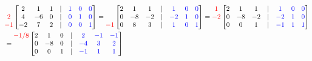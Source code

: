 \documentclass[reqno]{amsart}
\theoremstyle{definition}
\begin{document}
\begin{align*}
&\begin{matrix}
\\
{\color{red}2}\\
{\color{red}-1}
\end{matrix}\begin{bmatrix}
2 & 1 & 1 & | & {\color{blue}1} & {\color{blue}0} & {\color{blue}0}\\
4 & -6 & 0 & | & {\color{blue}0} & {\color{blue}1} & {\color{blue}0}\\
-2 & 7 & 2 & | & {\color{blue}0} & {\color{blue}0} & {\color{blue}1}
\end{bmatrix} = \begin{matrix}
\\
\\
{\color{red}-1}
\end{matrix}\begin{bmatrix}
2 & 1 & 1 & | & {\color{blue}1} & {\color{blue}0} & {\color{blue}0}\\
0 & -8 & -2 & | & {\color{blue}-2} & {\color{blue}1} & {\color{blue}0}\\
0 & 8 & 3 & | & {\color{blue}1} & {\color{blue}0} & {\color{blue}1}
\end{bmatrix} = \begin{matrix}
{\color{red}1}\\
{\color{red}-2}\\
\\
\end{matrix}\begin{bmatrix}
2 & 1 & 1 & | & {\color{blue}1} & {\color{blue}0} & {\color{blue}0}\\
0 & -8 & -2 & | & {\color{blue}-2} & {\color{blue}1} & {\color{blue}0}\\
0 & 0 & 1 & | & {\color{blue}-1} & {\color{blue}1} & {\color{blue}1}
\end{bmatrix}\\
&= \begin{matrix}
{\color{red}-1/8}\\
\\
\\
\end{matrix}\begin{bmatrix}
2 & 1 & 0 & | & {\color{blue}2} & {\color{blue}-1} & {\color{blue}-1}\\
0 & -8 & 0 & | & {\color{blue}-4} & {\color{blue}3} & {\color{blue}2}\\
0 & 0 & 1 & | & {\color{blue}-1} & {\color{blue}1} & {\color{blue}1}

\end{bmatrix}
\end{align*}
\end{document}
